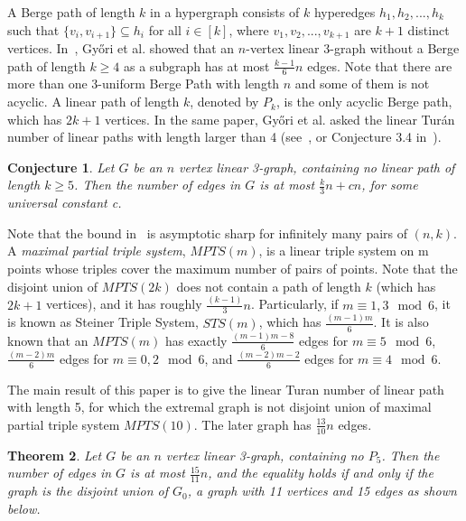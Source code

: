 \documentclass[a4paper]{article}
\newtheorem{thm}{Theorem}[section]
\newtheorem{conj}[thm]{Conjecture}
\newcommand{\ti}{\textit}
\newcommand{\emphd}[1]{{\fontseries{b}\selectfont\textsf{#1}}}
\begin{document}


A \emphd{Berge path} of length $k$ in a hypergraph consists of $k$ hyperedges $h_1, h_2,...,h_k$ such that $\{v_i,v_{i+1}\}\subseteq h_i$ for all $i \in [k]$, where $v_1, v_2,...,v_{k+1}$ are $k+1$ distinct vertices. In~\cite{MR4835949}, Gy\H{o}ri et al. showed that an $n$-vertex linear 3-graph without a Berge path of length $k\ge 4$ as a subgraph has at most $\frac{k-1}{6}n$ edges. Note that there are more than one 3-uniform Berge Path with length $n$ and some of them is not acyclic. A \emphd{linear path} of length $k$, denoted by $P_k$, is the only acyclic Berge path, which has  $2k+1$ vertices.  In the same paper, Gy\H{o}ri et al. asked the linear Tur\'an number of {linear paths} with length larger than 4 (see~, or Conjecture 3.4 in~\cite{MR4835949}).


\begin{conj}\label{conj1.1}
	Let $G$ be an $n$ vertex linear 3-graph, containing no linear
	path of length $k \ge 5$. Then the number of edges in $G$ is at most $\frac{k}{3}n+cn$, for some universal constant c.
\end{conj}


Note that the bound in~ is asymptotic sharp for infinitely many pairs of {$(n,k)$}. A \ti{maximal partial triple system}, $MPTS(m)$, is a linear triple system on m points whose triples cover the maximum number of pairs of points.  Note that the disjoint union of $MPTS(2k)$ does not contain a path of length $k$ (which has $2k+1$ vertices), and it has roughly $\frac{(k-1)}{3}n$. Particularly, if $m\equiv 1,3 \mod{6}$, it is known as Steiner Triple System, $STS(m)$, which has $\frac{(m-1)m}{6}$. It is also known that an $MPTS(m)$ has exactly $\frac{(m-1)m-8}{6}$ edges for $m\equiv 5 \mod{6}$, $\frac{(m-2)m}{6}$ edges for $m\equiv 0,2 \mod{6}$,  and $\frac{(m-2)m-2}{6}$ edges for $m\equiv 4 \mod{6}$.

The main result of this paper is to give the linear Turan number of linear path with length 5, for which the extremal graph is not disjoint union of maximal partial triple system $MPTS(10)$. The later graph has $\frac{13}{10}n$ edges.


\begin{thm}\label{main}
Let $G$ be an $n$ vertex linear 3-graph, containing no $P_5$. Then the number of edges in $G$ is at most $\frac{15}{11}n$, and the equality holds if and only if the graph is the disjoint union of $G_0$, a graph with 11 vertices and 15 edges as shown below.
\end{thm}
\end{document}
